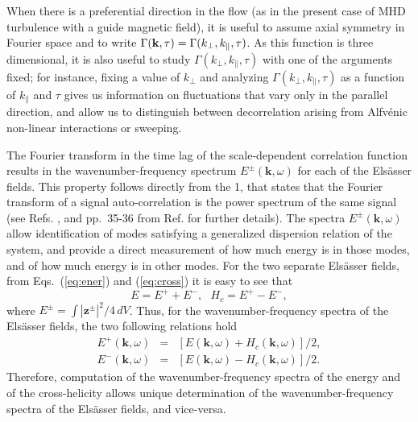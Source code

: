 \documentclass[aip,pop,reprint,amsmath,amssymb,floatfix]{revtex4-1}
\renewcommand{\vec}[1]{\mathbf{#1}}
\begin{document}
When there is a preferential direction in the flow (as in the present
case of MHD turbulence with a guide magnetic field), it is useful to
assume axial symmetry in Fourier space and to write
$\Gamma({\bf k},\tau) = \Gamma(k_\perp,k_\parallel,\tau)$. As this
function is three dimensional, it is also useful to study
$\Gamma(k_\perp,k_\parallel,\tau)$ with one of the arguments fixed;
for instance, fixing a value of $k_\perp$ and analyzing
$\Gamma(k_\perp,k_\parallel,\tau)$ as a function of $k_\parallel$ and
$\tau$ gives us information on fluctuations that vary only in the
parallel direction, and allow us to distinguish between decorrelation
arising from Alfv\'enic non-linear interactions or sweeping.

The Fourier transform in the time lag of the scale-dependent
correlation function results in the wavenumber-frequency spectrum
$E^\pm(\vec{k},\omega)$ for each of the Els\"asser fields. 
This property follows directly from the 1, that 
states that the Fourier transform of a signal auto-correlation is the 
power spectrum of the same signal (see Refs. 
\cite{clark_di_leoni_quantification_2014, 
clark_di_leoni_spatio-temporal_2015}, and pp.~35-36 from Ref. 
\cite{batchelor_theory_1953} for further details). The spectra
$E^\pm(\vec{k},\omega)$ allow identification of modes satisfying a
generalized dispersion relation of the system, and provide a direct
measurement of how much energy is in those modes, and of how much
energy is in other modes. For the two separate Els\"asser fields, from
Eqs.~(\ref{eq:ener}) and (\ref{eq:cross}) it is easy to see that
\begin{equation}
  E = E^+ + E^- , \,\,\,\, H_c = E^+ - E^- ,
\end{equation}
where $E^\pm = \int |\vec{z}^\pm|^2/4 \, dV$. Thus, for the
wavenumber-frequency spectra of the Els\"asser fields, the two
following relations hold
\begin{eqnarray}
  E^+(\vec{k},\omega) &=& [E(\vec{k},\omega) + H_c(\vec{k},\omega)]/2, \\
  E^-(\vec{k},\omega) &=& [E(\vec{k},\omega) - H_c(\vec{k},\omega)]/2.
\end{eqnarray}
Therefore, computation of the wavenumber-frequency spectra of the
energy and of the cross-helicity allows unique determination of the
wavenumber-frequency spectra of the Els\"asser fields, and vice-versa.
\end{document}
